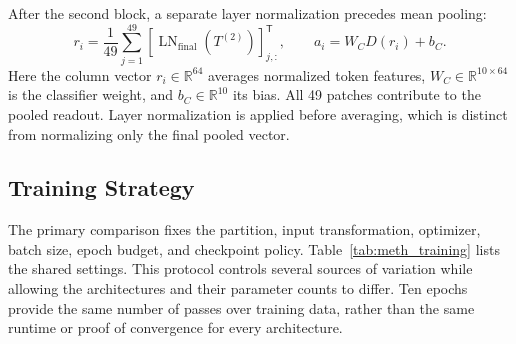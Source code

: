 After the second block, a separate layer normalization precedes mean pooling:
\begin{equation}
 r_i=\frac{1}{49}\sum_{j=1}^{49}
       [\operatorname{LN}_{\mathrm{final}}(T^{(2)})]_{j,:}^{\mathsf T},\qquad
 a_i=W_C D(r_i)+b_C.
 \label{eq:meth_pool}
\end{equation}
Here the column vector $r_i\in\mathbb{R}^{64}$ averages normalized token features,
$W_C\in\mathbb{R}^{10\times64}$ is the classifier weight, and
$b_C\in\mathbb{R}^{10}$ its bias. All 49 patches contribute to the pooled readout.
Layer normalization is applied before averaging, which is distinct from
normalizing only the final pooled vector.

\clearpage
\subsection{Training Strategy}
\label{sec:meth_training}
The primary comparison fixes the partition, input transformation, optimizer,
batch size, epoch budget, and checkpoint policy. Table~\ref{tab:meth_training}
lists the shared settings. This protocol controls several sources of variation
while allowing the architectures and their parameter counts to differ.
Ten epochs provide the same number of passes over training data, rather than
the same runtime or proof of convergence for every architecture.

